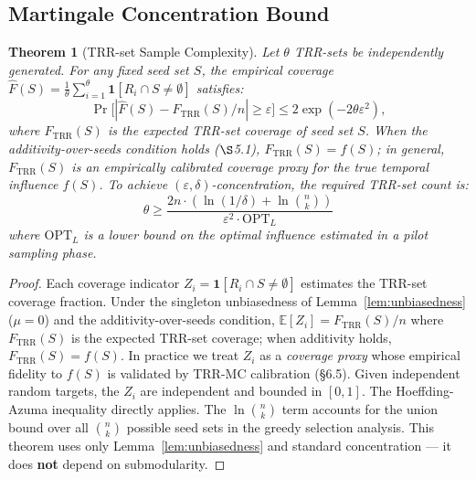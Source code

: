 \documentclass[10pt,conference]{IEEEtran}
\newtheorem{theorem}{Theorem}
\begin{document}
\subsection{Martingale Concentration Bound}

\begin{theorem}[TRR-set Sample Complexity]
\label{thm:martingale}
Let $\theta$ TRR-sets be independently generated.
For any fixed seed set $S$, the empirical coverage $\hat{F}(S) = \frac{1}{\theta} \sum_{i=1}^{\theta} \mathbf{1}[R_i \cap S \neq \emptyset]$ satisfies:
\begin{equation}
\Pr\big[|\hat{F}(S) - F_{\text{TRR}}(S)/n| \ge \varepsilon\big] \le 2\exp(-2\theta\varepsilon^2),
\label{eq:hoeffding}
\end{equation}
where $F_{\text{TRR}}(S)$ is the expected TRR-set coverage of seed set $S$. When the additivity-over-seeds condition holds ($\S$5.1), $F_{\text{TRR}}(S) = f(S)$; in general, $F_{\text{TRR}}(S)$ is an empirically calibrated coverage proxy for the true temporal influence $f(S)$.
To achieve $(\varepsilon,\delta)$-concentration, the required TRR-set count is:
\begin{equation}
\theta \ge \frac{2n \cdot (\ln(1/\delta) + \ln\binom{n}{k})}{\varepsilon^2 \cdot \text{OPT}_L}
\label{eq:theta_bound}
\end{equation}
where $\text{OPT}_L$ is a lower bound on the optimal influence estimated in a pilot sampling phase.
\end{theorem}

\begin{proof}
Each coverage indicator $Z_i = \mathbf{1}[R_i \cap S \neq \emptyset]$ estimates the TRR-set coverage fraction. Under the singleton unbiasedness of Lemma~\ref{lem:unbiasedness} ($\mu{=}0$) and the additivity-over-seeds condition, $\mathbb{E}[Z_i] = F_{\text{TRR}}(S)/n$ where $F_{\text{TRR}}(S)$ is the expected TRR-set coverage; when additivity holds, $F_{\text{TRR}}(S) = f(S)$. In practice we treat $Z_i$ as a \emph{coverage proxy} whose empirical fidelity to $f(S)$ is validated by TRR-MC calibration (\S6.5).
Given independent random targets, the $Z_i$ are independent and bounded in $[0,1]$.
The Hoeffding-Azuma inequality directly applies.
The $\ln\binom{n}{k}$ term accounts for the union bound over all $\binom{n}{k}$ possible seed sets in the greedy selection analysis.
This theorem uses only Lemma~\ref{lem:unbiasedness} and standard concentration — it does \textbf{not} depend on submodularity.
\end{proof}
\end{document}
